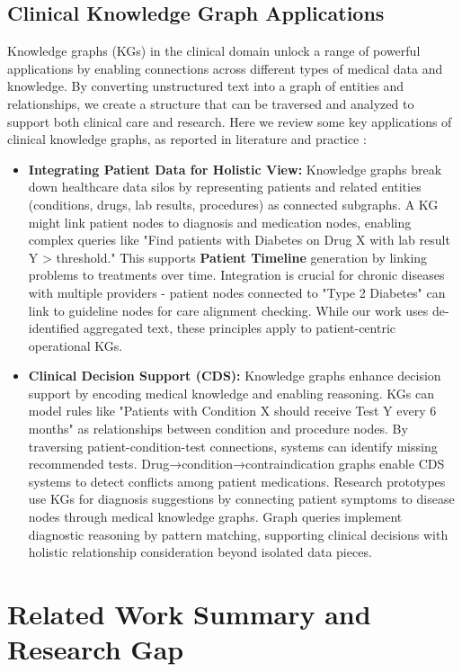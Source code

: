 \subsection{Clinical Knowledge Graph Applications}

Knowledge graphs (KGs) in the clinical domain unlock a range of powerful applications by enabling connections across different types of medical data and knowledge. By converting unstructured text into a graph of entities and relationships, we create a structure that can be traversed and analyzed to support both clinical care and research. Here we review some key applications of clinical knowledge graphs, as reported in literature and practice \parencite{Milvus2025}:

\begin{itemize}
\item \textbf{Integrating Patient Data for Holistic View:} Knowledge graphs break down healthcare data silos by representing patients and related entities (conditions, drugs, lab results, procedures) as connected subgraphs. A KG might link patient nodes to diagnosis and medication nodes, enabling complex queries like "Find patients with Diabetes on Drug X with lab result Y > threshold." This supports \textbf{Patient Timeline} generation by linking problems to treatments over time. Integration is crucial for chronic diseases with multiple providers - patient nodes connected to "Type 2 Diabetes" can link to guideline nodes for care alignment checking. While our work uses de-identified aggregated text, these principles apply to patient-centric operational KGs.

\item \textbf{Clinical Decision Support (CDS):} Knowledge graphs enhance decision support by encoding medical knowledge and enabling reasoning. KGs can model rules like "Patients with Condition X should receive Test Y every 6 months" as relationships between condition and procedure nodes. By traversing patient-condition-test connections, systems can identify missing recommended tests. Drug→condition→contraindication graphs enable CDS systems to detect conflicts among patient medications. Research prototypes use KGs for diagnosis suggestions by connecting patient symptoms to disease nodes through medical knowledge graphs. Graph queries implement diagnostic reasoning by pattern matching, supporting clinical decisions with holistic relationship consideration beyond isolated data pieces.
\end{itemize}

\section{Related Work Summary and Research Gap}

